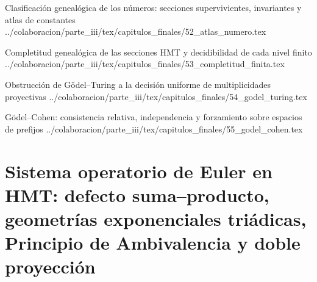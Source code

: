 

\HMTSuccessorChapterInput
  {Clasificación genealógica de los números: secciones supervivientes, invariantes y atlas de constantes}
  {../colaboracion/parte_iii/tex/capitulos_finales/52_atlas_numero.tex}

\HMTSuccessorChapterInput
  {Completitud genealógica de las secciones HMT y decidibilidad de cada nivel finito}
  {../colaboracion/parte_iii/tex/capitulos_finales/53_completitud_finita.tex}

\HMTSuccessorChapterInput
  {Obstrucción de Gödel--Turing a la decisión uniforme de multiplicidades proyectivas}
  {../colaboracion/parte_iii/tex/capitulos_finales/54_godel_turing.tex}

\HMTSuccessorChapterInput
  {Gödel--Cohen: consistencia relativa, independencia y forzamiento sobre espacios de prefijos}
  {../colaboracion/parte_iii/tex/capitulos_finales/55_godel_cohen.tex}

\chapter{Sistema operatorio de Euler en HMT: defecto suma--producto, geometrías exponenciales triádicas, Principio de Ambivalencia y doble proyección}


\let\HMTSuccessorChapterInput\relax
